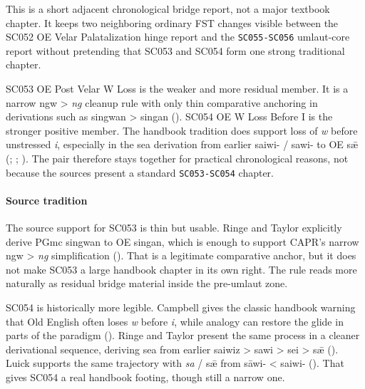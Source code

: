 \documentclass[
  british,
  a4paper,
]{article}
\begin{document}
This is a short adjacent chronological bridge report, not a major
textbook chapter. It keeps two neighboring ordinary FST changes visible
between the SC052 OE Velar Palatalization hinge report and the
\texttt{SC055-SC056} umlaut-core report without pretending that SC053
and SC054 form one strong traditional chapter.

SC053 OE Post Velar W Loss is the weaker and more residual member. It is
a narrow ngw \textgreater{} \emph{ng} cleanup rule with only thin
comparative anchoring in derivations such as singwan \textgreater{}
singan (). SC054 OE W Loss Before I is the stronger positive member. The
handbook tradition does support loss of \emph{w} before unstressed
\emph{i}, especially in the sea derivation from earlier saiwi- / sawi-
to OE sǣ (;
;
). The pair
therefore stays together for practical chronological reasons, not
because the sources present a standard \texttt{SC053-SC054} chapter.

\paragraph{Source tradition}\label{source-tradition-33}

The source support for SC053 is thin but usable. Ringe and Taylor
explicitly derive PGmc singwan to OE singan, which is enough to support
CAPR's narrow ngw \textgreater{} \emph{ng} simplification
().
That is a legitimate comparative anchor, but it does not make SC053 a
large handbook chapter in its own right. The rule reads more naturally
as residual bridge material inside the pre-umlaut zone.

SC054 is historically more legible. Campbell gives the classic handbook
warning that Old English often loses \emph{w} before \emph{i}, while
analogy can restore the glide in parts of the paradigm
(). Ringe and
Taylor present the same process in a cleaner derivational sequence,
deriving sea from earlier saiwiz \textgreater{} sawi \textgreater{} sei
\textgreater{} sǣ (). Luick supports the same trajectory with \emph{sa} / sǣ
from sāwi- \textless{} saiwi- (). That gives SC054 a real handbook footing,
though still a narrow one.
\end{document}
